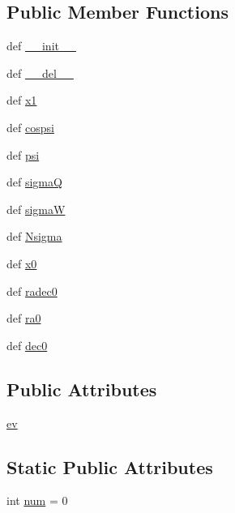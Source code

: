 \subsection*{Public Member Functions}
\begin{DoxyCompactItemize}
\item 
def \hyperlink{classamonpy_1_1anal_1_1cluster_1_1_fisher_a1e13053a9daa25129c9c2090b2834434}{\-\_\-\-\_\-init\-\_\-\-\_\-}
\item 
def \hyperlink{classamonpy_1_1anal_1_1cluster_1_1_fisher_a238e5334a3a13208ebeac508dedc55ff}{\-\_\-\-\_\-del\-\_\-\-\_\-}
\item 
def \hyperlink{classamonpy_1_1anal_1_1cluster_1_1_fisher_add8460bfd7a9fa30956eee8248ccff99}{x1}
\item 
def \hyperlink{classamonpy_1_1anal_1_1cluster_1_1_fisher_ab95d705b923546dc9977d8171b6eab49}{cospsi}
\item 
def \hyperlink{classamonpy_1_1anal_1_1cluster_1_1_fisher_a685cc6a7da95f2d37d5aac4eea88e244}{psi}
\item 
def \hyperlink{classamonpy_1_1anal_1_1cluster_1_1_fisher_ac3ecfdabbf304533940d63c1af93de8f}{sigma\-Q}
\item 
def \hyperlink{classamonpy_1_1anal_1_1cluster_1_1_fisher_ab42c5b1d33517dacb0f4885607873780}{sigma\-W}
\item 
def \hyperlink{classamonpy_1_1anal_1_1cluster_1_1_fisher_aaaec3b4e68a97b73d359858cdd11ad65}{Nsigma}
\item 
def \hyperlink{classamonpy_1_1anal_1_1cluster_1_1_fisher_a20eff95eb8d36f153875752a81fcadbc}{x0}
\item 
def \hyperlink{classamonpy_1_1anal_1_1cluster_1_1_fisher_a8f261458556cf374fb773fe17950610d}{radec0}
\item 
def \hyperlink{classamonpy_1_1anal_1_1cluster_1_1_fisher_aa91ec0a66f3d15037cc2e9c4fe51e258}{ra0}
\item 
def \hyperlink{classamonpy_1_1anal_1_1cluster_1_1_fisher_a60cc5f63c12c34f67e51de2dbf7b1ad2}{dec0}
\end{DoxyCompactItemize}
\subsection*{Public Attributes}
\begin{DoxyCompactItemize}
\item 
\hyperlink{classamonpy_1_1anal_1_1cluster_1_1_fisher_a00d2f81ecb3a6a6f6258f39444d1fa60}{ev}
\end{DoxyCompactItemize}
\subsection*{Static Public Attributes}
\begin{DoxyCompactItemize}
\item 
int \hyperlink{classamonpy_1_1anal_1_1cluster_1_1_fisher_a2c44a65df3f24bc786522df8d5aa2db7}{num} = 0
\end{DoxyCompactItemize}


